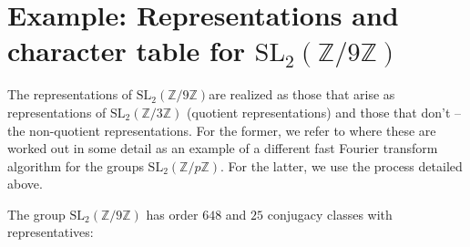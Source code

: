 \documentclass[12pt,reqno]{amsart}
\theoremstyle{remark}
\numberwithin{table}{section}
\newcommand{\C}{\mathbb C}
\newcommand{\Z}{\mathbb Z}
\begin{document}
%
%
%
%
%
%
%

\pagebreak


\section{Example: Representations and character table for $\text{SL$_2$}(\Z/9 \Z) $}

The representations of $\text{SL$_2$}(\Z/9 \Z) $are realized as those that arise as representations of $\text{SL$_2$}(\Z/3 \Z) $ (quotient representations) and those that don't -- the non-quotient representations. For the former, we refer to \cite{MR-duco} where these are worked out in some detail as an example of a different fast Fourier transform algorithm for the groups  $\text{SL$_2$}(\Z/p\Z) $. For the latter, we use the process detailed above. 

The group $\text{SL$_2$}(\Z/9 \Z) $ has order $648$ and $25$ conjugacy classes with representatives:
\end{document}

